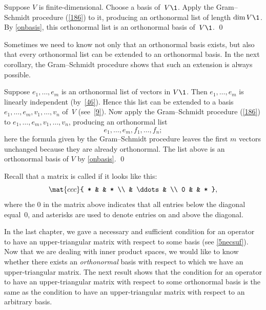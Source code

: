 
\proof
Suppose $V$ is finite-dimensional. Choose a basis of~$V\1$.  Apply the Gram--Schmidt procedure (\ref{186}) to
it, producing an orthonormal list of length $\dim V\1$. By \ref{onbasis}, this orthonormal list is an orthonormal basis of~$V\1$.
\qed

Sometimes we need to know not only that an orthonormal
basis exists, but also that every orthonormal list can be extended to an
orthonormal basis.  In the next corollary, the Gram--Schmidt procedure shows
that such an extension is always possible.


\proof
Suppose $e_1, \dots, e_m$ is an orthonormal list of vectors in $V\1$.  Then
$e_1, \dots, e_m$ is linearly independent (by~\ref{46}). Hence this list can be
extended to a basis $e_1, \dots, e_m, v_1, \dots, v_n$ of~$V$ (see~\ref{9}). Now
apply  the Gram--Schmidt procedure (\ref{186}) to
$e_1, \dots, e_m, v_1, \dots, v_n$, producing an  orthonormal list
\[
e_1, \dots, e_m, f_1, \dots, f_n;
\]
here the formula given by the Gram--Schmidt procedure leaves the first $m$ vectors unchanged because they are already orthonormal.  The list above is an  orthonormal basis of $V$ by \ref{onbasis}.
\qed

Recall that a matrix is called  if it looks like this:
\[
\mat{ccc}{ * & & * \\ & \ddots & \\ 0 & & * },
\]
where the $0$ in the matrix above indicates that all entries below the diagonal equal~$0$, and asterisks are used to denote entries on and above the diagonal.

In the last chapter, we gave a necessary and sufficient condition for an operator to have an upper-triangular matrix with respect to some basis (see \ref{5necsuf}). Now that we are dealing with inner product spaces, we would like to know whether there
exists an \textit{orthonormal} basis with respect to which we have an upper-triangular matrix. The next result shows that the condition for an operator to have an upper-triangular matrix with respect to some orthonormal basis is the same as the condition to have an upper-triangular matrix with respect to an arbitrary basis.

